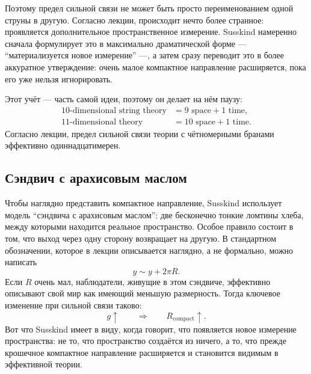 Поэтому предел сильной связи не может быть просто переименованием одной струны в другую. Согласно лекции, происходит нечто более странное: проявляется дополнительное пространственное измерение. Susskind намеренно сначала формулирует это в максимально драматической форме --- ``материализуется новое измерение'' ---, а затем сразу переводит это в более аккуратное утверждение: очень малое компактное направление расширяется, пока его уже нельзя игнорировать.

Этот учёт — часть самой идеи, поэтому он делает на нём паузу:
\begin{equation}
\begin{aligned}
10\text{-dimensional string theory} &= 9\text{ space}+1\text{ time},\\
11\text{-dimensional theory} &= 10\text{ space}+1\text{ time}.
\end{aligned}
\end{equation}
Согласно лекции, предел сильной связи теории с чётномерными бранами эффективно одиннадцатимерен.


\subsection{Сэндвич с арахисовым маслом}

Чтобы наглядно представить компактное направление, Susskind использует модель ``сэндвича с арахисовым маслом'': две бесконечно тонкие ломтины хлеба, между которыми находится реальное пространство. Особое правило состоит в том, что выход через одну сторону возвращает на другую. В стандартном обозначении, которое в лекции описывается наглядно, а не формально, можно написать
\begin{equation}
y \sim y + 2\pi R.
\end{equation}
Если \(R\) очень мал, наблюдатели, живущие в этом сэндвиче, эффективно описывают свой мир как имеющий меньшую размерность. Тогда ключевое изменение при сильной связи таково:
\begin{equation}
g\uparrow
\qquad \Longrightarrow \qquad
R_{\mathrm{compact}}\uparrow.
\end{equation}
Вот что Susskind имеет в виду, когда говорит, что появляется новое измерение пространства: не то, что пространство создаётся из ничего, а то, что прежде крошечное компактное направление расширяется и становится видимым в эффективной теории.

